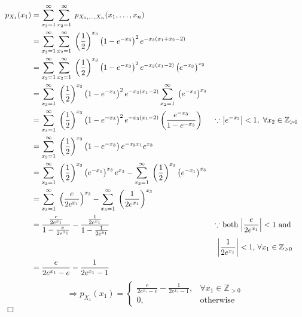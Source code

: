 \documentclass{mthe353answer}
\begin{document}
  \begin{questions}
    \question\
    \begin{align*}
      p_{X_1}(x_1) &= \sum_{x_3 = 1}^{\infty}\sum_{x_2 = 1}^{\infty}\; p_{X_1,\ldots,X_n}(x_1,\ldots,x_n)\\
      &= \sum_{x_3 = 1}^{\infty} \sum_{x_2 = 1}^{\infty}\; \left(\frac{1}{2}\right)^{x_3} \left(1-e^{-x_3}\right)^2 e^{-x_3(x_1+x_2-2)}\\
      &= \sum_{x_3 = 1}^{\infty} \sum_{x_2 = 1}^{\infty}\; \left(\frac{1}{2}\right)^{x_3} \left(1-e^{-x_3}\right)^2 e^{-x_3(x_1-2)} \left(e^{-x_3}\right)^{x_2}\\
      &= \sum_{x_3 = 1}^{\infty}\; \left(\frac{1}{2}\right)^{x_3} \left(1-e^{-x_3}\right)^2 e^{-x_3(x_1-2)} \sum_{x_2 = 1}^{\infty}\; \left(e^{-x_3}\right)^{x_2}\\
      &= \sum_{x_3 = 1}^{\infty}\; \left(\frac{1}{2}\right)^{x_3} \left(1-e^{-x_3}\right)^2 e^{-x_3(x_1-2)} \left(\frac{e^{-x_3}}{1-e^{-x_3}}\right)
        && \text{\(\because\) \( \left\lvert e^{-x_2} \right\rvert < 1,\ \forall x_2 \in \mathbb{Z}_{>0} \)}\\
      &= \sum_{x_3 = 1}^{\infty}\; \left(\frac{1}{2}\right)^{x_3} \left(1-e^{-x_3}\right) e^{-x_3x_1} e^{x_3}\\
      &= \sum_{x_3 = 1}^{\infty}\; \left(\frac{1}{2}\right)^{x_3} \left(e^{-x_1}\right)^{x_3} e^{x_3} - \sum_{x_3 = 1}^{\infty}\; \left(\frac{1}{2}\right)^{x_3} \left(e^{-x_1}\right)^{x_3}\\
      &= \sum_{x_3 = 1}^{\infty}\; \left(\frac{e}{2e^{x_1}}\right)^{x_3} - \sum_{x_3 = 1}^{\infty}\; \left(\frac{1}{2e^{x_1}}\right)^{x_3}\\
      &= \frac{\frac{e}{2e^{x_1}}}{1 - \frac{e}{2e^{x_1}}} - \frac{\frac{1}{2e^{x_1}}}{1 - \frac{1}{2e^{x_1}}}
        && \text{\(\because\) both \( \left\lvert \frac{e}{2e^{x_1}} \right\rvert < 1 \) and }\\
      & && \text{ \( \left\lvert \frac{1}{2e^{x_1}} \right\rvert < 1 \), \( \forall x_1 \in \mathbb{Z}_{>0} \) }\\
      &= \frac{e}{2e^{x_1} - e} - \frac{1}{2e^{x_1} - 1}
    \end{align*}
    \begin{displaymath}
      \Rightarrow p_{X_1}(x_1) = 
        \begin{cases}
          \frac{e}{2e^{x_1} - e} - \frac{1}{2e^{x_1} - 1}, & \forall x_1 \in \mathbb{Z}_{>0}\\
          0, & \text{otherwise}
        \end{cases}
    \end{displaymath}
    \hfill \(\Box\)
  \end{questions}
\end{document}
